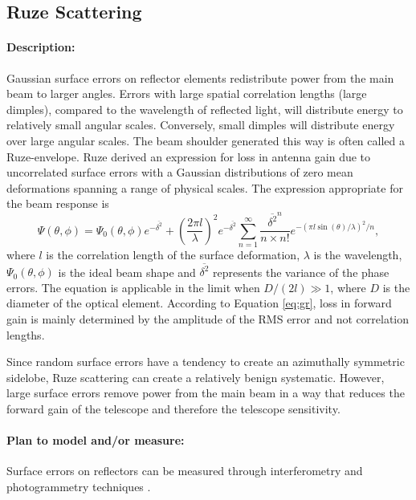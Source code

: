 \subsection{Ruze Scattering}

\paragraph{Description:}

Gaussian surface errors on reflector elements redistribute power from the main beam to larger angles. Errors with large spatial correlation lengths (large dimples), compared to the wavelength of reflected light, will distribute energy to relatively small angular scales. Conversely, small dimples will distribute energy over large angular scales. The beam shoulder generated this way is often called a Ruze-envelope. Ruze derived an expression for loss in antenna gain due to uncorrelated surface errors with a Gaussian distributions of zero mean deformations spanning a range of physical scales. The expression appropriate for the beam response is \cite{Ruze1966}
\begin{equation} 
\Psi(\theta,\phi) = \Psi_0(\theta,\phi) e^{-\overline{\delta^2}} + \left( \frac{2 \pi l}{\lambda} \right)^2 e^{-\overline{\delta^2}} \sum_{n=1}^{\infty} \frac{\overline{\delta^2}^n}{n \times n!} e^{-\left(\pi l \sin(\theta) / \lambda \right)^2/n},
\label{eq:gr}
\end{equation}
where $l$ is the correlation length of the surface deformation, $\lambda$ is the wavelength, $\Psi_0(\theta,\phi)$ is the ideal beam shape and $\overline{\delta^2}$ represents the variance of the phase errors. The equation is applicable in the limit when $D/(2l) \gg 1$, where $D$ is the diameter of the optical element. According to Equation \ref{eq:gr}, loss in forward gain is mainly determined by the amplitude of the RMS error and not correlation lengths.

Since random surface errors have a tendency to create an azimuthally symmetric sidelobe, Ruze scattering can create a relatively benign systematic. However, large surface errors remove power from the main beam in a way that reduces the forward gain of the telescope and therefore the telescope sensitivity.

\paragraph{Plan to model and/or measure:}
Surface errors on reflectors can be measured through interferometry and photogrammetry techniques \cite{Hincks2008, Tauber2010}.

